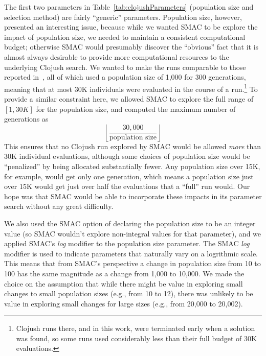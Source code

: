 \documentclass{llncs}
\begin{document}
The first two parameters in Table~\ref{tab:clojushParameters} (population size
and selection method) are fairly ``generic'' parameters. Population size, 
however, presented an interesting issue, because while we wanted SMAC to be
explore the impact of population size, we needed to maintain a consistent
computational budget; otherwise SMAC would presumably discover the ``obvious''
fact that it is almost always desirable to provide more computational resources to the underlying Clojush search. We wanted to make the runs comparable to those
reported in~\cite{Helmuth:GECCO:2015}, all of which used a population size of
1,000 for 300 generations, meaning that at most 30K individuals were evaluated 
in the course of a run.\footnote{Clojush runs there, and in this work, 
	were terminated early when a solution was found, so some runs used
	considerably less than their full budget of 30K evaluations.} To provide
a similar constraint here, we allowed SMAC to explore the full range of 
$[1, 30K]$ for the population size, and computed the maximum number of
generations as
\[
	\left \lfloor{\frac{30,000}{\textrm{population size}}}\right \rfloor
\]
This ensures that no Clojush run explored by SMAC would be allowed 
\emph{more} than 30K individual evaluations, although some choices of 
population size would be ``penalized'' by being allocated substantially fewer. 
Any population size over 15K, for example, would get only one generation, which 
means a population size just over 15K would get just over half the evaluations 
that a ``full'' run would. Our hope was that SMAC would be able to incorporate
these impacts in its parameter search without any great difficulty.

We also used the SMAC option of declaring the population size to be an
integer value (so SMAC wouldn't explore non-integral values for that parameter),
and we applied SMAC's \emph{log} modifier to the population size parameter.
The SMAC \emph{log} modifier is used to indicate parameters that naturally
vary on a logrithmic scale. This means that from SMAC's perspective a change
in population size from 10 to 100 has the same magnitude as a change from 1,000 to
10,000. We made the choice on the assumption that while there might be value
in exploring small changes to small population sizes (e.g., from 10 to 12),
there was unlikely to be value in exploring small changes for large sizes
(e.g., from 20,000 to 20,002).
\end{document}
